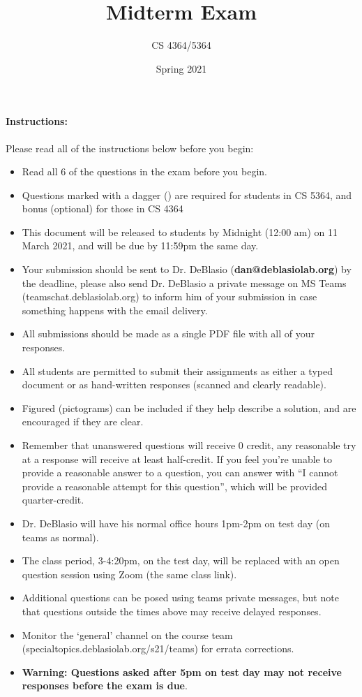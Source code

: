 \documentclass[11pt, oneside]{article}   	%
\title{Midterm Exam}
\author{CS 4364/5364}
\date{Spring 2021}							%
\begin{document}
\maketitle

\paragraph{Instructions:}
Please read all of the instructions below before you begin:
\begin{itemize}
\item Read all 6 of the questions in the exam before you begin. 
\item Questions marked with a dagger (\dag) are required for students in CS 5364, and bonus (optional) for those in CS 4364
\item This document will be released to students by Midnight (12:00 am) on 11 March 2021, and will be due by 11:59pm the same day. 
\item Your submission should be sent to Dr. DeBlasio (\textbf{dan@deblasiolab.org}) by the deadline, please also send Dr. DeBlasio a private message on MS Teams (teamschat.deblasiolab.org) to inform him of your submission in case something happens with the email delivery. 
\item All submissions should be made as a single PDF file with all of your responses. 
\item All students are permitted to submit their assignments as either a typed document or as hand-written responses (scanned and clearly readable). 
\item Figured (pictograms) can be included if they help describe a solution, and are encouraged if they are clear. 
\item Remember that unanswered questions will receive 0 credit, any reasonable try at a response will receive at least half-credit. If you feel you're unable to provide a reasonable answer to a question, you can answer with ``I cannot provide a reasonable attempt for this question'', which will be provided quarter-credit. 
\item Dr. DeBlasio will have his normal office hours 1pm-2pm on test day (on teams as normal). 
\item The class period, 3-4:20pm, on the test day, will be replaced with an open question session using Zoom (the same class link).
\item Additional questions can be posed using teams private messages, but note that questions outside the times above may receive delayed responses. 
\item Monitor the `general' channel on the course team (specialtopics.deblasiolab.org/s21/teams) for errata corrections. 
\item \textbf{{\color{red}Warning:} Questions asked after 5pm on test day may not receive responses before the exam is due}.  
\end{itemize}
\end{document}
